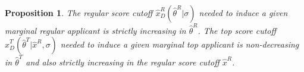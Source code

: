 \documentclass[12pt,reqno]{amsart}
\newtheorem{proposition}{Proposition}
\theoremstyle{definition}
\theoremstyle{plain} %
\begin{document}

\begin{proposition}\label{prop:demand}
The regular score cutoff $\hat{x}^R_D(\hat{\theta}^R|\sigma)$ needed to induce a given marginal regular applicant is strictly increasing in $\hat{\theta}^R$. The top score cutoff $\hat{x}^T_D(\hat{\theta}^T|\hat{x}^R,\sigma)$ needed to induce a given marginal top applicant is non-decreasing   in $\hat{\theta}^T$ and also strictly increasing in the regular score cutoff $\hat{x}^R$. 
\end{proposition}

% 
\end{document}
